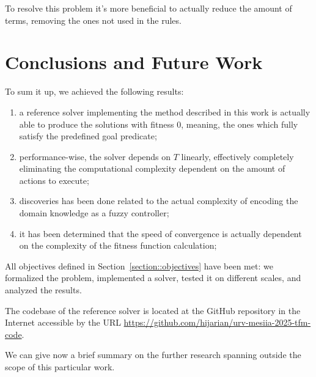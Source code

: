 \documentclass[12pt, a4paper]{report}
\begin{document}
	To resolve this problem it's more beneficial to actually reduce the amount of terms, removing the ones not used in the rules.
	


	
	\chapter{Conclusions and Future Work}\label{section::conclusions}

	To sum it up, we achieved the following results:
	
	\begin{enumerate}
		\item a reference solver implementing the method described in this work is actually able to produce the solutions with fitness 0, meaning, the ones which fully satisfy the predefined goal predicate;
		\item performance-wise, the solver depends on $T$ linearly, effectively completely eliminating the computational complexity dependent on the amount of actions to execute;
		\item discoveries has been done related to the actual complexity of encoding the domain knowledge as a fuzzy controller;
		\item it has been determined that the speed of convergence is actually dependent on the complexity of the fitness function calculation;
	\end{enumerate}
	
	All objectives defined in Section~\ref{section::objectives} have been met: we formalized the problem, implemented a solver, tested it on different scales, and analyzed the results.
		
	The codebase of the reference solver is located at the GitHub repository in the Internet accessible by the URL \url{https://github.com/hijarian/urv-mesiia-2025-tfm-code}.
	
	We can give now a brief summary on the further research spanning outside the scope of this particular work.
	
\end{document}
